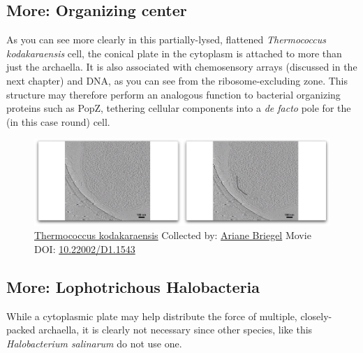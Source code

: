 \documentclass[]{tufte-book}
\begin{document}
\hypertarget{Organizing_center}{\subsection*{More: Organizing
center}\label{Organizing_center}}

As you can see more clearly in this partially-lysed, flattened
\emph{Thermococcus kodakaraensis} cell, the conical plate in the
cytoplasm is attached to more than just the archaella. It is also
associated with chemosensory arrays (discussed in the next chapter) and
DNA, as you can see from the ribosome-excluding zone. This structure may
therefore perform an analogous function to bacterial organizing proteins
such as PopZ, tethering cellular components into a \emph{de facto} pole
for the (in this case round) cell.





\begin{figure}
\includegraphics{movie_stills/6_9b} \caption[\protect\hyperlink{tree}{Thermococcus kodakaraensis}
Collected by: \protect\hyperlink{ariane_briegel}{Ariane Briegel} Movie
DOI: \href{https://doi.org/10.22002/D1.1543}{10.22002/D1.1543}]{\protect\hyperlink{tree}{Thermococcus kodakaraensis}
Collected by: \protect\hyperlink{ariane_briegel}{Ariane Briegel} Movie
DOI: \href{https://doi.org/10.22002/D1.1543}{10.22002/D1.1543}}\label{fig:6-9b}
\end{figure}

\hypertarget{Lophotrichous_Halobacteria}{\subsection*{More:
Lophotrichous Halobacteria}\label{Lophotrichous_Halobacteria}}

While a cytoplasmic plate may help distribute the force of multiple,
closely-packed archaella, it is clearly not necessary since other
species, like this \emph{Halobacterium salinarum} do not use one.
\end{document}
